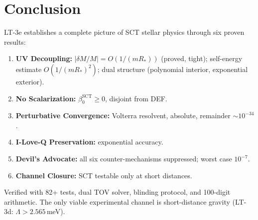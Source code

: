 \documentclass[12pt,a4paper]{article}
\newcommand{\Lam}{\Lambda}
\newcommand{\Rstar}{R_*}
\begin{document}
\section{Conclusion}
\label{sec:conclusion}

LT-3e establishes a complete picture of SCT stellar physics through
six proven results:

\begin{enumerate}
  \item \textbf{UV Decoupling:} $|\delta M/M| = O(1/(m\Rstar))$ (proved, tight);
    self-energy estimate $O(1/(m\Rstar)^2)$; dual structure (polynomial interior,
    exponential exterior).
  \item \textbf{No Scalarization:} $\beta_0^{\mathrm{SCT}} \geq 0$, disjoint from DEF.
  \item \textbf{Perturbative Convergence:} Volterra resolvent, absolute, remainder $\sim 10^{-34}$.
  \item \textbf{I-Love-Q Preservation:} exponential accuracy.
  \item \textbf{Devil's Advocate:} all six counter-mechanisms suppressed; worst case $10^{-7}$.
  \item \textbf{Channel Closure:} SCT testable only at short distances.
\end{enumerate}

\noindent
Verified with 82+ tests, dual TOV solver, blinding protocol, and
100-digit arithmetic.  The only viable experimental channel is
short-distance gravity (LT-3d: $\Lam > 2.565$\,meV).
\end{document}
